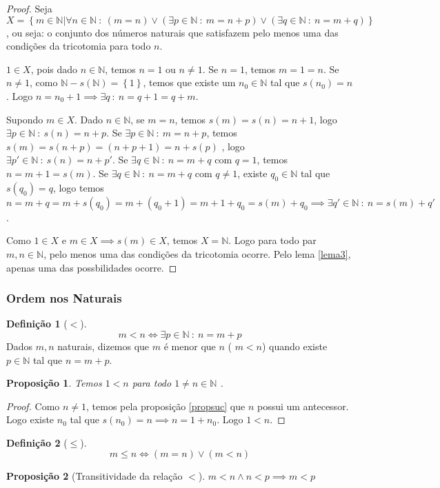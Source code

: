 \documentclass{article}
\theoremstyle{plain}
\newtheorem{prop}{Proposição}[section]
\theoremstyle{definition}
\newtheorem{definicao}{Definição}[section]
\theoremstyle{remark}
\begin{document}
\begin{proof}
	Seja $X = \left\{m \in \mathbb{N} | \forall n \in \mathbb{N} \: : \: (m = n ) \lor (	\exists p \in \mathbb{N} \: : \: m = n+p ) \lor ( 	\exists q \in \mathbb{N} \: : \: n = m+q ) \right\}$, ou seja: o conjunto dos números naturais que satisfazem pelo menos uma das condições da tricotomia para todo $n$.  

	$1\in X$, pois dado $n\in \mathbb{N}$, temos $n = 1$ ou $n\neq 1$. Se $n=1$, temos $m =1 = n$. Se $n\neq 1$, como $\mathbb{N} - s(\mathbb{N}) = \left\{1\right\}$, temos que existe um $n_0\in \mathbb{N}$ tal que $s(n_0) = n$. Logo $n = n_0 +1 \implies \exists q \: : \: n = q+1  = q+m $.
	
	Supondo $m\in X$. Dado $n\in \mathbb{N}$, se $m = n$, temos $s(m) = s(n) = n+1$, logo $\exists p \in\mathbb{N} \: : \: s(n) = n+p$. Se  $\exists p \in\mathbb{N} \: : \: m = n+p$, temos $s(m) = s(n+p) = (n+p+1) = n +s(p)$ , logo $\exists p' \in\mathbb{N} \: : \: s(n) = n+p'$. Se $\exists q \in \mathbb{N} \: : \: n = m+q $ com $q=1$, temos $n = m+1 = s(m)$. Se $\exists q \in \mathbb{N} \: : \: n = m+q $ com $q\neq 1$, existe $q_0\in \mathbb{N}$ tal que $s(q_0) = q$, logo temos $n = m+q = m +s(q_0) = m+(q_0+1) = m+1+q_0 = s(m)+q_0 \implies \exists q' \in \mathbb{N} \: : \: n = s(m)+q' $. 

	Como $1\in X$ e $m\in X \implies s(m) \in X$, temos $X = \mathbb{N}$.  Logo para todo par $m,n\in \mathbb{N}$, pelo menos uma das condições da tricotomia ocorre. Pelo lema \ref{lema3}, apenas uma das possbilidades ocorre. 
\end{proof}
\subsubsection{Ordem nos Naturais}
\begin{definicao}[$<$]
	$$ m<n \iff \exists p\in \mathbb{N} \: : \: n = m+p$$
	Dados $m,n$ naturais, dizemos que $m$ é menor que $n$ ( $m<n$) quando existe $p\in \mathbb{N}$ tal que $n = m+p$.
\end{definicao}

\begin{prop}
	Temos $1 < n $ para todo $ 1 \neq n \in \mathbb{N}$ .
\end{prop}
\begin{proof}
	Como $n \neq 1$, temos pela proposição \ref{propsuc} que $n$ possui um antecessor. Logo existe $n_0$ tal que $s(n_0) =n \implies n  = 1+n_0$. Logo $1<n$.
\end{proof}
\begin{definicao}[$\leq$]
	$$m \leq n \iff (m = n) \lor (m <n)$$
\end{definicao}
\begin{prop}[Transitividade da relação $<$]
	$m< n \land n< p \implies m < p$
\end{prop}
\end{document}
